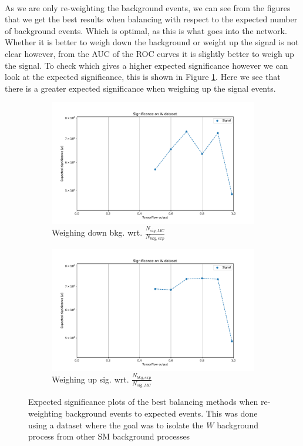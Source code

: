 \documentclass[12pt, a4paper]{book}
\begin{document}
\\As we are only re-weighting the background events, we can see from the figures that we get the best results when balancing with respect to the expected number of background events. Which is optimal, as this is what goes into the network. 
Whether it is better to weigh down the background or weight up the signal is not clear however, from the AUC of the ROC curves it is slightly better to weigh up the signal. To check which gives a higher expected significance however we can look at 
the expected significance, this is shown in Figure \ref{fig:WSIG}. Here we see that there is a greater expected significance when weighing up the signal events. \\
\begin{figure}[!ht]
	\centering
      \begin{subfigure}[b]{0.49\textwidth}
            \centering
            \includegraphics[width=1\textwidth]{bkg_exp/EXP_SIG.pdf}
            \caption{Weighing down bkg. wrt. $\frac{N_{sig,MC}}{N_{bkg,exp}}$ }
         \end{subfigure}
         \hfill
         \begin{subfigure}[b]{0.49\textwidth}
            \centering
            \includegraphics[width=1\textwidth]{sig_exp/EXP_SIG.pdf}
            \caption{Weighing up sig. wrt. $\frac{N_{bkg,exp}}{N_{sig,MC}}$}
         \end{subfigure}
      \caption[Significance plots for re-weighting and balancing W dataset on NNs]{Expected significance plots of the best balancing methods when re-weighting background events to expected events. 
      This was done using a dataset where the goal was to isolate the $W$ background process from other SM background processes}\label{fig:WSIG}
\end{figure}
\end{document}
